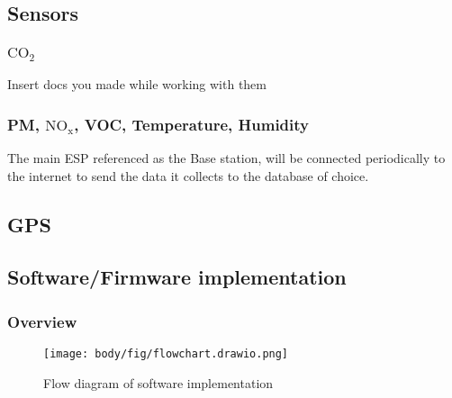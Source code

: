\subsection{Sensors}
\subsubsection{$\mathrm{CO_2}$}
{\color{red} \huge Insert docs you made while working with them}



\subsubsection{PM, $\mathrm{NO_x}$, VOC, Temperature, Humidity}
\noindent
The main ESP referenced as the Base station, will be connected periodically to the internet to send the data it collects to the database of choice. 

\subsection{GPS}

\pagebreak
\subsection{Software/Firmware implementation}
\subsubsection{Overview}

\begin{figure}[!htb]
	\centering
	\texttt{[image: body/fig/flowchart.drawio.png]}
	\caption{Flow diagram of software implementation }
	\label{fig:softwareoverview}
\end{figure}

